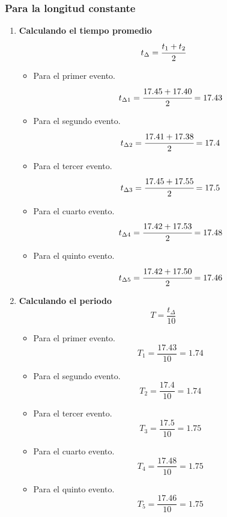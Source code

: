 \subsubsection{Para la longitud constante}
\begin{enumerate}[label=\bfseries\alph*.-,itemsep=2pt]
	\item \textbf{Calculando el tiempo promedio}
	      \[t_\Delta = \cfrac{t_1+t_2}{2}\]
	      \begin{itemize}[label=\textbf{$\bullet$},itemsep=2pt,partopsep=6pt,parsep=6pt]
		      \item Para el primer  evento.
		            \[t_{\Delta{1}}=\cfrac{17.45+17.40}{2}=17.43\]
		      \item Para el segundo evento.
		            \[t_{\Delta{2}}=\cfrac{17.41+17.38}{2}=17.4\]
		      \item Para el tercer  evento.
		            \[t_{\Delta{3}}=\cfrac{17.45+17.55}{2}=17.5\]
		      \item Para el cuarto  evento.
		            \[t_{\Delta{4}}=\cfrac{17.42+17.53}{2}=17.48\]
		      \item Para el quinto  evento.
		            \[t_{\Delta{5}}=\cfrac{17.42+17.50}{2}=17.46\]
	      \end{itemize}

	\item \textbf{Calculando el periodo}
	      \[T = \dfrac{t_\Delta}{10}\]
	      \begin{itemize}[label=\textbf{$\bullet$},itemsep=2pt,partopsep=6pt,parsep=6pt]
		      \item Para el primer evento.
		            \[T_1 = \dfrac{17.43}{10}=1.74\]
		      \item Para el segundo evento.
		            \[T_2 = \dfrac{17.4}{10}=1.74\]
		      \item Para el tercer evento.
		            \[T_3 = \dfrac{17.5}{10}=1.75\]
		      \item Para el cuarto evento.
		            \[T_4 = \dfrac{17.48}{10}=1.75\]
		      \item Para el quinto evento.
		            \[T_5 = \dfrac{17.46}{10}=1.75\]
	      \end{itemize}


\end{enumerate}
